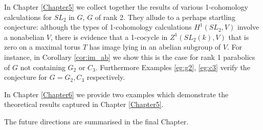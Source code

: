 In Chapter \ref{Chapter5} we collect together the results of various 1-cohomology calculations for $SL_2$ in $G$, $G$ of rank 2. They allude to a perhaps startling conjecture: although the types of 1-cohomology calculations $H^1(SL_2, V)$ involve a nonabelian $V$, there is evidence that a 1-cocycle in $Z^1(SL_2(k), V)$ that is zero on a maximal torus $T$ has image lying in an abelian subgroup of $V$. For instance, in Corollary \ref{cor:im_ab} we show this is the case for rank 1 parabolics of $G$ not containing $G_2$ or $C_3$. Furthermore Examples \ref{eg:g2}, \ref{eg:c3} verify the conjecture for $G = G_2, C_3$ respectively.

In Chapter \ref{Chapter6} we provide two examples which demonstrate the theoretical results captured in Chapter \ref{Chapter5}.

The future directions are summarised in the final Chapter.
